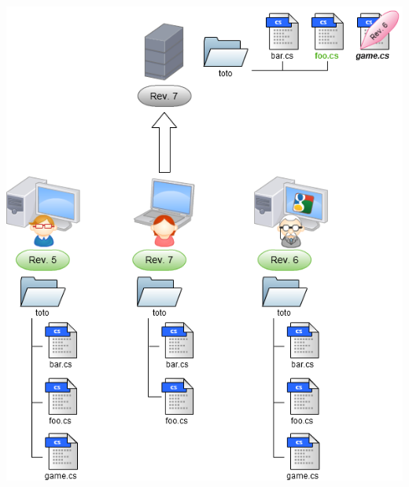 \begin{frame}
  \begin{center}
    \includegraphics[scale=0.3]{images/10-Commit4.png}
  \end{center}
\end{frame}

